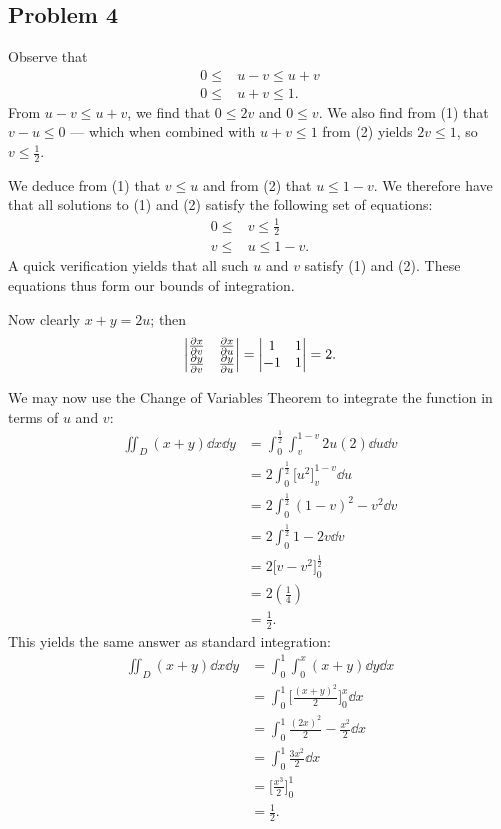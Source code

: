\documentclass[11pt]{article}
\begin{document}

\subsection*{Problem 4}

Observe that
\begin{align}
	0 \le & u - v \le u + v \\
	0 \le & u + v \le 1.
\end{align}
From $u - v \le u + v$, we find that $0 \le 2v$ and $0 \le v$. We also find from (1) that $v - u \le 0$ --- which when combined with $u + v \le 1$ from (2) yields $2v \le 1$, so $v \le \tfrac{1}{2}$.

We deduce from (1) that $v \le u$ and from (2) that $u \le 1 - v$. We therefore have that all solutions to (1) and (2) satisfy the following set of equations:
\begin{align*}
	0 \le & v \le \frac{1}{2} \\
	v \le & u \le 1 - v.
\end{align*}
A quick verification yields that all such $u$ and $v$ satisfy (1) and (2). These equations thus form our bounds of integration.

Now clearly $x + y = 2u$; then
\[
	\begin{vmatrix} \pdv{x}{v} & \pdv{x}{u} \\ \pdv{y}{v} & \pdv{y}{u} \end{vmatrix} = \begin{vmatrix} 1 & 1 \\ -1 & 1 \end{vmatrix} = 2.
\]

\newpage

We may now use the Change of Variables Theorem to integrate the function in terms of $u$ and $v$:
\begin{align*}
	\iint_{D}(x + y) \dd{x} \dd{y} &= \int_{0}^{\tfrac{1}{2}} \int_{v}^{1 - v} 2u (2) \dd{u} \dd{v} \\
	&= 2 \int_{0}^{\tfrac{1}{2}} \Big[ u^{2} \Big]_{v}^{1 - v} \dd{u} \\
	&= 2 \int_{0}^{\tfrac{1}{2}} (1 - v)^{2} - v^{2} \dd{v} \\
	&= 2 \int_{0}^{\tfrac{1}{2}} 1 - 2v \dd{v} \\
	&= 2 \Big[ v - v^{2} \Big]_{0}^{\tfrac{1}{2}} \\
	&= 2 \left( \frac{1}{4} \right) \\
	&= \boxed{\frac{1}{2}}. 
\end{align*}
This yields the same answer as standard integration:
\begin{align*}
	\iint_{D} (x + y) \dd{x} \dd{y} &= \int_{0}^{1} \int_{0}^{x} (x + y) \dd{y} \dd{x} \\
	&= \int_{0}^{1} \Big[ \frac{(x + y)^{2}}{2} \Big]_{0}^{x} \dd{x} \\
	&= \int_{0}^{1} \frac{(2x)^{2}}{2} - \frac{x^{2}}{2} \dd{x} \\
	&= \int_{0}^{1} \frac{3x^{2}}{2} \dd{x} \\
	&= \Big[ \frac{x^{3}}{2} \Big]_{0}^{1} \\
	&= \boxed{\frac{1}{2}}.
\end{align*}
\end{document}
